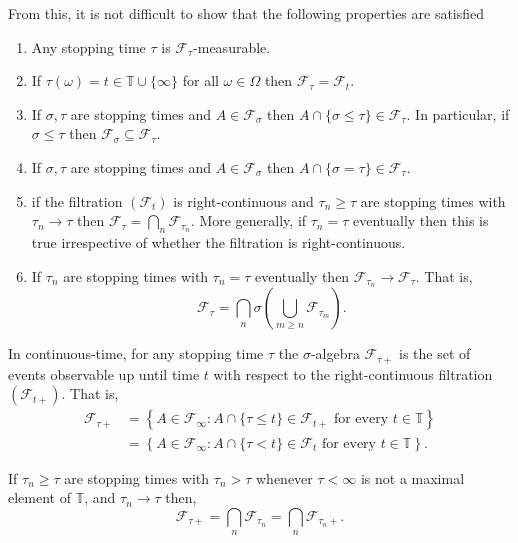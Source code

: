 \documentclass[12pt]{article}
\begin{document}
From this, it is not difficult to show that the following properties are satisfied
\begin{enumerate}
\item Any stopping time $\tau$ is $\mathcal{F}_\tau$-measurable.
\item If $\tau(\omega)=t\in\mathbb{T}\cup\{\infty\}$ for all $\omega\in\Omega$ then $\mathcal{F}_\tau=\mathcal{F}_t$.
\item If $\sigma,\tau$ are stopping times and $A\in\mathcal{F}_\sigma$ then $A\cap\{\sigma\le\tau\}\in\mathcal{F}_\tau$. In particular, if $\sigma\le\tau$ then $\mathcal{F}_\sigma\subseteq\mathcal{F}_\tau$.
\item If $\sigma,\tau$ are stopping times and $A\in\mathcal{F}_\sigma$ then $A\cap\{\sigma=\tau\}\in\mathcal{F}_\tau$.
\item if the filtration $(\mathcal{F}_t)$ is right-continuous and $\tau_n\ge\tau$ are stopping times with $\tau_n\rightarrow\tau$ then $\mathcal{F}_\tau=\bigcap_n\mathcal{F}_{\tau_n}$. More generally, if $\tau_n=\tau$ eventually then this is true irrespective of whether the filtration is right-continuous.
\item If $\tau_n$ are stopping times with $\tau_n=\tau$ eventually then $\mathcal{F}_{\tau_n}\rightarrow\mathcal{F}_\tau$. That is,
\begin{equation*}
\mathcal{F}_\tau=\bigcap_n\sigma\left(\bigcup_{m\ge n}\mathcal{F}_{\tau_m}\right).
\end{equation*}
\end{enumerate}

In continuous-time, for any stopping time $\tau$ the $\sigma$-algebra $\mathcal{F}_{\tau+}$ is the set of events observable up until time $t$ with respect to the right-continuous filtration $(\mathcal{F}_{t+})$. That is,
\begin{equation*}\begin{split}
\mathcal{F}_{\tau+}&=\left\{A\in\mathcal{F}_\infty:A\cap\{\tau\le t\}\in\mathcal{F}_{t+}\textrm{ for every }t\in\mathbb{T}\right\}\\
&=\left\{A\in\mathcal{F}_\infty:A\cap\{\tau< t\}\in\mathcal{F}_t\textrm{ for every }t\in\mathbb{T}\right\}.
\end{split}\end{equation*}

If $\tau_n\ge\tau$ are stopping times with $\tau_n>\tau$ whenever $\tau<\infty$ is not a maximal element of $\mathbb{T}$, and $\tau_n\rightarrow\tau$ then,
\begin{equation*}
\mathcal{F}_{\tau+}=\bigcap_n\mathcal{F}_{\tau_n}=\bigcap_n\mathcal{F}_{\tau_n+}.
\end{equation*}
\end{document}
